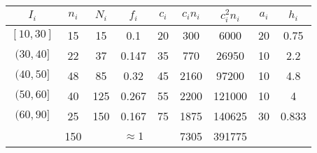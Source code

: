 \documentclass[11pt,a4paper]{article}
\theoremstyle{definition}
\begin{document}
\begin{table}[!htbp]
\hspace{1cm}\begin{tabular}{|c|c|c|c|c|c|c|c|c|}
\multicolumn{1}{c|}{$I_i$} & $n_i$ & $N_i$ & $f_i$ & $c_i$ & $c_in_i$ & $c_i^2n_i$ & $a_i$ & $h_i$ \\ \hline
$[10, 30]$ & 15 & 15 & 0.1 & 20 & 300 & 6000 & 20 & 0.75 \\
$(30, 40]$ & 22 & 37 & 0.147 & 35 & 770 & 26950 & 10 & 2.2 \\
$(40, 50]$ & 48 & 85 & 0.32 & 45 & 2160 & 97200 & 10 & 4.8 \\
$(50, 60]$ & 40 & 125 & 0.267 & 55 & 2200 & 121000 & 10 & 4 \\
$(60, 90]$ & 25 & 150 & 0.167 & 75 & 1875 & 140625 & 30 & 0.833 \\
\hline
\multicolumn{1}{c}{} & \multicolumn{1}{|c|}{150} & \multicolumn{1}{c}{} & \multicolumn{1}{|c|}{$\approx1$} &\multicolumn{1}{c}{} &\multicolumn{1}{|c|}{7305}& \multicolumn{1}{c|}{391775}  \\ \cline{2-2} \cline{4-4} \cline{6-7}
\end{tabular}
\end{table}
\end{document}
